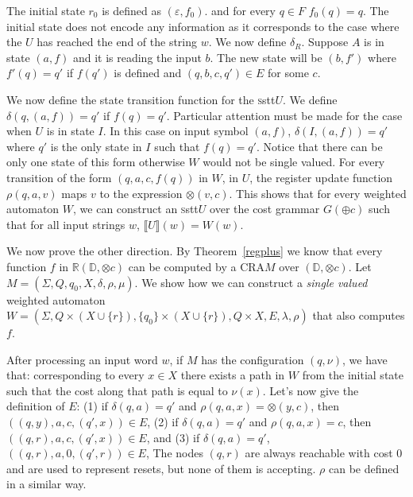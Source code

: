 \documentclass[11pt]{article}
\newcommand{\domain}{\ensuremath{\mathbb{D}}}
\newcommand{\CG}{G}
\newcommand{\reg}[1]{{\mathbb R}(#1)}
\newcommand{\SSTT}{{\sc\textsc sstt}\xspace}
\newcommand{\stt}{\ensuremath{U}}
\newcommand{\inputalph}{\ensuremath{\Sigma}}
\newcommand{\valuation}{\ensuremath{\nu}}
\newcommand{\interp}[1]{\ensuremath{\llbracket #1\rrbracket}}
\newcommand{\EDWA}{{CRA}\xspace}
\newcommand{\edwa}{\ensuremath{M}}
\newcommand{\edwastates}{\ensuremath{Q}}
\newcommand{\edwastate}{\ensuremath{q}}
\newcommand{\edwainitst}{\ensuremath{\edwastate_0}}
\newcommand{\edwavariables}{\ensuremath{X}}
\newcommand{\edwatrans}{\ensuremath{\delta}}
\newcommand{\edwavarup}{\ensuremath{\rho}}
\newcommand{\edwafinal}{\ensuremath{\mu}}
\newcommand{\wa}{\ensuremath{W}}
\newcommand{\wainitst}{\ensuremath{I}}
\newcommand{\wafinalst}{\ensuremath{F}}
\newcommand{\watrans}{\ensuremath{E}}
\newcommand{\wainit}{\ensuremath{\lambda}}
\newcommand{\wafinal}{\ensuremath{\rho}}
\def\myplus{\otimes}
\def\mytimes{\oplus}
\begin{document}
The initial state $r_0$ is defined as $(\varepsilon,f_0)$.  and for
every $q\in\wafinalst$ $f_0(q)=q$. The initial state does not encode
any information as it corresponds to the case where the $\stt$ has
reached the end of the string $w$.  We now define $\delta_R$. Suppose
$A$ is in state $(a,f)$ and it is reading the input $b$. The new state
will be $(b,f')$ where $f'(q)=q'$ if $f(q')$ is defined and
$(q,b,c,q')\in \watrans$ for some $c$.

We now define the state transition function for the \SSTT $\stt$. We
define $\delta(q,(a,f))=q'$ if $f(q)=q'$.  Particular attention must
be made for the case when $\stt$ is in state $\wainitst$.  In this
case on input symbol $(a,f)$, $\delta(\wainitst,(a,f))=q'$ where $q'$
is the only state in $\wainitst$ such that $f(q)=q'$. Notice that
there can be only one state of this form otherwise $\wa$ would not be
single valued.  For every transition of the form $(q,a,c,f(q))$ in
$\wa$, in $\stt$, the register update function $\rho(q,a,v)$ maps $v$
to the expression $\myplus(v,c)$. This shows that for every weighted
automaton $\wa$, we can construct an \SSTT $\stt$ over the cost
grammar $\CG(\mytimes c)$ such that for all input strings $w$,
$\interp{\stt}(w) = \wa(w)$.

We now prove the other direction.  By Theorem~\ref{regplus} we know
that every function $f$ in $\reg{\domain,\myplus c}$ can be computed
by a \EDWA $\edwa$ over $(\domain, \myplus c)$. Let
$\edwa=(\inputalph,\edwastates,\edwainitst,\edwavariables,\edwatrans,\edwavarup,\edwafinal)$.
We show how we can construct a \emph{single valued} weighted automaton
$\wa=(\inputalph, \edwastates\times(\edwavariables\cup\{r\}),
\{\edwainitst\}\times(\edwavariables\cup\{r\}),
\edwastates\times\edwavariables,\watrans, \wainit, \wafinal)$ that
also computes $f$.

After processing an input word $w$, if $\edwa$ has the configuration
$(\edwastate,\valuation)$, we have that: corresponding to every $x\in
X$ there exists a path in $\wa$ from the initial state such that the
cost along that path is equal to $\valuation(x)$.  Let's now give the
definition of $E$:
(1) if $\delta(q,a)=q'$ and $\rho(q,a,x)=\myplus(y,c)$, then $((q,y),a,c,(q',x))\in E$,
(2) if $\delta(q,a)=q'$ and $\rho(q,a,x)=c$, then $((q,r),a,c,(q',x))\in E$, and
(3) if $\delta(q,a)=q'$, $((q,r),a,0,(q',r))\in E$,
The nodes $(q,r)$ are always reachable with cost $0$ and are used to
represent resets, but none of them is accepting. $\wafinal$ can be
defined in a similar way.
\end{document}
